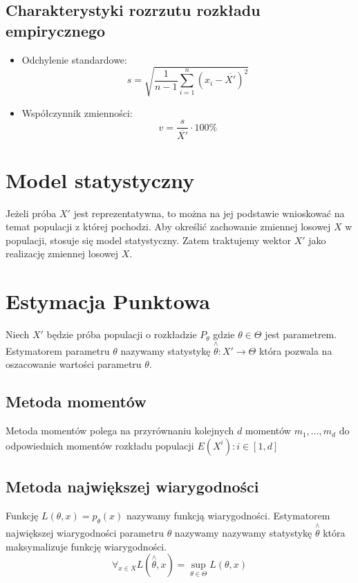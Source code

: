 \documentclass{../notatki}
\begin{document}
\subsection{Charakterystyki rozrzutu rozkładu empirycznego}

\begin{itemize}
  \item Odchylenie standardowe:
    $$
    s = \sqrt{\frac{1}{n - 1} \sum_{i=1}^n (x_i - \overline{X'})^2}
    $$
  \item Współczynnik zmienności:
    $$
    v = \frac{s}{\overline{X'}} \cdot 100\%
    $$
\end{itemize}

\section{Model statystyczny}

Jeżeli próba $X'$ jest reprezentatywna, to można na jej podstawie
wnioskować na temat populacji z której pochodzi. Aby określić zachowanie
zmiennej losowej $X$ w populacji, stosuje się model statystyczny.
Zatem traktujemy wektor $X'$ jako realizację zmiennej losowej $X$.

\section{Estymacja Punktowa}

Niech $X'$ będzie próba populacji o rozkładzie $P_\theta$ gdzie
$\theta \in \Theta$ jest parametrem. Estymatorem parametru $\theta$
nazywamy statystykę $\stackrel{\wedge}{\theta}: X' \rightarrow
\Theta$ która pozwala na
oszacowanie wartości parametru $\theta$.

\subsection{Metoda momentów}

Metoda momentów polega na przyrównaniu kolejnych $d$ momentów $m_1, \dots, m_d$
do odpowiednich momentów rozkładu populacji $E(X^i): i \in [1, d]$

\subsection{Metoda największej wiarygodności}

Funkcję $L(\theta, x) = p_\theta(x)$ nazywamy funkcją wiarygodności. Estymatorem
największej wiarygodności parametru $\theta$ nazywamy nazywamy statystykę
$\stackrel{\wedge}{\theta}$ która maksymalizuje funkcję wiarygodności.
$$
\forall_{x \in X} L(\stackrel{\wedge}{\theta}, x) = \sup_{\theta \in
\Theta} L(\theta, x)
$$
\end{document}
